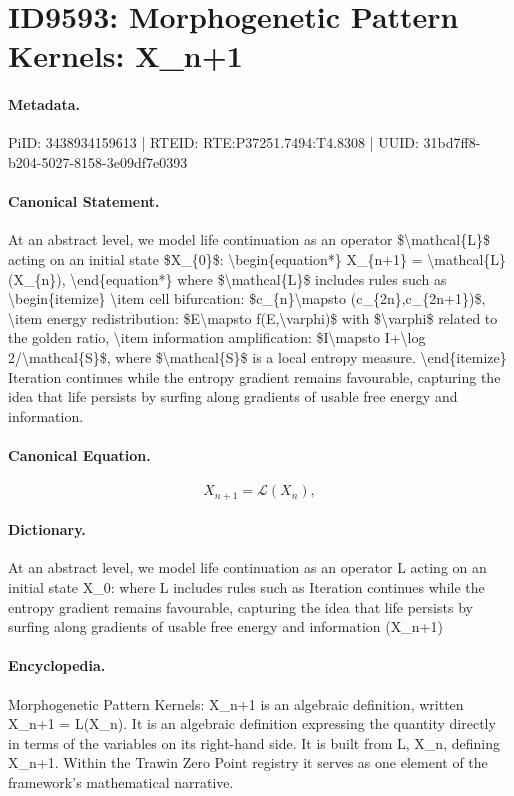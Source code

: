 \section*{ID9593: Morphogenetic Pattern Kernels: X\_n+1}
\paragraph{Metadata.}
PiID: 3438934159613 | RTEID: RTE:P37251.7494:T4.8308 | UUID: 31bd7ff8-b204-5027-8158-3e09df7e0393

\paragraph{Canonical Statement.}
At an abstract level, we model life continuation as an operator \$\textbackslash{}mathcal\{L\}\$ acting on an initial state \$X\_\{0\}\$: \textbackslash{}begin\{equation*\} X\_\{n+1\} = \textbackslash{}mathcal\{L\}(X\_\{n\}), \textbackslash{}end\{equation*\} where \$\textbackslash{}mathcal\{L\}\$ includes rules such as \textbackslash{}begin\{itemize\} \textbackslash{}item cell bifurcation: \$c\_\{n\}\textbackslash{}mapsto (c\_\{2n\},c\_\{2n+1\})\$, \textbackslash{}item energy redistribution: \$E\textbackslash{}mapsto f(E,\textbackslash{}varphi)\$ with \$\textbackslash{}varphi\$ related to the golden ratio, \textbackslash{}item information amplification: \$I\textbackslash{}mapsto I+\textbackslash{}log 2/\textbackslash{}mathcal\{S\}\$, where \$\textbackslash{}mathcal\{S\}\$ is a local entropy measure. \textbackslash{}end\{itemize\} Iteration continues while the entropy gradient remains favourable, capturing the idea that life persists by surfing along gradients of usable free energy and information.

\paragraph{Canonical Equation.}
\[
X_{n+1} = \mathcal{L}(X_{n}),
\]

\paragraph{Dictionary.}
At an abstract level, we model life continuation as an operator L acting on an initial state X\_0: where L includes rules such as Iteration continues while the entropy gradient remains favourable, capturing the idea that life persists by surfing along gradients of usable free energy and information (X\_n+1)

\paragraph{Encyclopedia.}
Morphogenetic Pattern Kernels: X\_n+1 is an algebraic definition, written X\_n+1 = L(X\_n). It is an algebraic definition expressing the quantity directly in terms of the variables on its right-hand side. It is built from L, X\_n, defining X\_n+1. Within the Trawin Zero Point registry it serves as one element of the framework's mathematical narrative.
